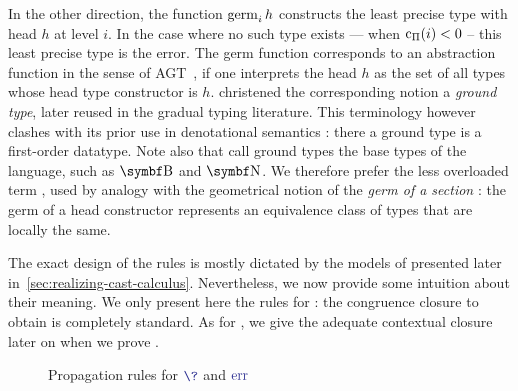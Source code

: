 \AP In the other direction, the  function $\mathop{\operatorname{germ}_{i}} h$ constructs the least
precise type with head $h$ at level $i$.
In the case where no such type exists — \eg when $\mathop{\mathrm{c}_\Pi}(i) < 0$ –
this least precise type is the error.
The germ function corresponds to an abstraction function in the sense of
AGT~, if one interprets the head $h$
as the set of all types whose head type constructor is $h$.
 christened the corresponding notion a
\emph{ground type}, later reused in the gradual typing literature.
This terminology however clashes with its prior use in denotational semantics
: there a ground type is a first-order datatype.
Note also that 
call ground types the base types of the 
language, such as $\Bool$ and $\Nat$.
We therefore prefer the less overloaded term , used by analogy with the
geometrical notion of the \emph{germ of a section}
: the germ of a head constructor represents an
equivalence class of types that are locally the same.

The exact design of the  rules is mostly dictated by
the models of  presented later in~\cref{sec:realizing-cast-calculus}.
Nevertheless, we now provide some intuition about their meaning. We only present here the
rules for %
: the congruence closure to obtain 
is completely standard. As for , we give the adequate
contextual closure later on when we prove .

\begin{figure*}[ht]
\ContinuedFloat*
{}
\caption{Propagation rules for $\tcol{\?}$ and $\tcol{\err}$}
\label{fig:ccic-red-propag}
\end{figure*}

